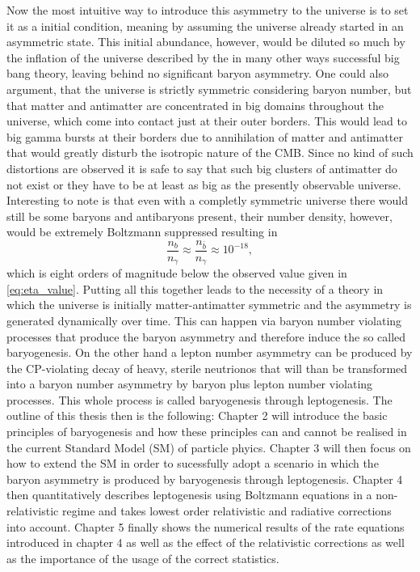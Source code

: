 Now the most intuitive way to introduce this asymmetry to the universe is to set it as a initial condition, meaning by assuming the universe already started in an asymmetric state. This initial abundance, however, would be diluted so much by the inflation of the universe described by the in many other ways successful big bang theory, leaving behind no significant baryon asymmetry. One could also argument, that the universe is strictly symmetric considering baryon number, but that matter and antimatter are concentrated in big domains throughout the universe, which come into contact just at their outer borders. This would lead to big gamma bursts at their borders due to annihilation of matter and antimatter that would greatly disturb the isotropic nature of the CMB. Since no kind of such distortions are observed it is safe to say that such big clusters of antimatter do not exist or they have to be at least as big as the presently observable universe\cite{Cline:2006ts}. Interesting to note is that even with a completly symmetric universe there would still be some baryons and antibaryons present, their number density, however, would be extremely Boltzmann suppressed resulting in
\begin{equation}
	\frac{n_b}{n_\gamma}\approx	\frac{n_{\bar{b}}}{n_\gamma}\approx10^{-18},
\end{equation}
which is eight orders of magnitude below the observed value given in \eqref{eq:eta_value}.\newline \indent
Putting all this together leads to the necessity of a theory in which the universe is initially matter-antimatter symmetric and the asymmetry is generated dynamically over time. This can happen via baryon number violating processes that produce the baryon asymmetry and therefore induce the so called baryogenesis. On the other hand a lepton number asymmetry can be produced by the CP-violating decay of heavy, sterile neutrionos that will than be transformed into a baryon number asymmetry by baryon plus lepton number violating processes. This whole process is called baryogenesis through leptogenesis. \newline \indent
The outline of this thesis then is the following: Chapter 2 will introduce the basic principles of baryogenesis and how these principles can and cannot be realised in the current Standard Model (SM) of particle phyics. Chapter 3 will then focus on how to extend the SM in order to sucessfully adopt a scenario in which the baryon asymmetry is produced by baryogenesis through leptogenesis. Chapter 4 then quantitatively describes leptogenesis using Boltzmann equations in a non-relativistic regime and takes lowest order relativistic and radiative corrections into account. Chapter 5 finally shows the numerical results of the rate equations introduced in chapter 4 as well as the effect of the relativistic%
corrections as well as the importance of the usage of the correct statistics.